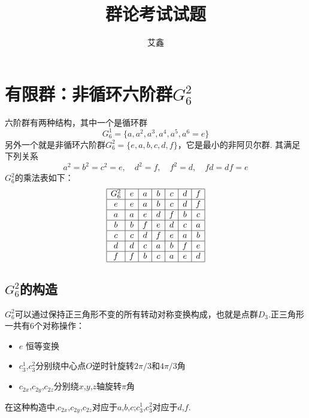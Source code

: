 \documentclass[UTF8]{ctexart}
\title{群论考试试题}
\author{艾鑫}
\begin{document}
\maketitle
\section{有限群：非循环六阶群$G_6^2$}
六阶群有两种结构，其中一个是循环群
\begin{equation}
G_6^1 = \{a,a^2,a^3,a^4,a^5,a^6=e\}
\end{equation}
另外一个就是非循环六阶群$G_6^2 = \{e,a,b,c,d,f\}$，它是最小的非阿贝尔群. 其满足下列关系
\begin{equation}
a^2=b^2=c^2=e, \quad d^2 = f, \quad f^2 = d, \quad fd = df = e
\end{equation}
$G_6^2$的乘法表如下：
\begin{equation}
\begin{array}{|c|c|c|c|c|c|c|}
\hline
G_6^2 & e & a & b & c & d & f \\
\hline
e & e & a & b & c & d & f \\
\hline
a & a & e & d & f & b & c \\
\hline
b & b & f & e & d & c & a \\
\hline
c & c & d & f & e & a & b \\
\hline
d & d & c & a & b & f & e \\
\hline
f & f & b & c & a & e & d \\
\hline
\end{array}
\end{equation}
\subsection{$G_6^2$的构造}

$G_6^2$可以通过保持正三角形不变的所有转动对称变换构成，也就是点群$D_3$.正三角形一共有6个对称操作：
\begin{itemize}
   \item $e$ 恒等变换
   \item $c_3^1$,$c_3^2$分别绕中心点$O$逆时针旋转$2\pi/3$和$4\pi/3$角
   \item $c_{2x}$,$c_{2y}$,$c_{2z}$分别绕$x$,$y$,$z$轴旋转$\pi$角
\end{itemize}
在这种构造中,$c_{2x}$,$c_{2y}$,$c_{2z}$对应于$a$,$b$,$c$;$c_3^1$,$c_3^2$对应于$d$,$f$.
\end{document}
